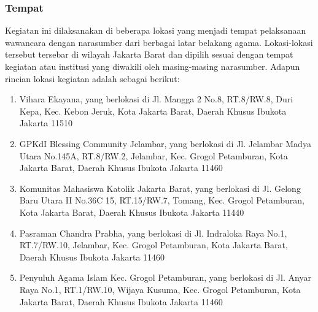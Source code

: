 \subsubsection{Tempat}
Kegiatan ini dilaksanakan di beberapa lokasi yang menjadi tempat pelaksanaan wawancara dengan narasumber dari berbagai latar belakang agama. Lokasi-lokasi tersebut tersebar di wilayah Jakarta Barat dan dipilih sesuai dengan tempat kegiatan atau institusi yang diwakili oleh masing-masing narasumber. Adapun rincian lokasi kegiatan adalah sebagai berikut:
\begin{sloppypar}
\begin{enumerate}[label = \arabic*.]
    \item Vihara Ekayana, yang berlokasi di Jl. Mangga 2 No.8, RT.8/RW.8, Duri Kepa, Kec. Kebon Jeruk, Kota Jakarta Barat, Daerah Khusus Ibukota Jakarta 11510
    
    \item GPKdI Blessing Community Jelambar, yang berlokasi di Jl. Jelambar Madya Utara No.145A, RT.8/RW.2, Jelambar, Kec. Grogol Petamburan, Kota Jakarta Barat, Daerah Khusus Ibukota Jakarta 11460
    
    \item Komunitas Mahasiswa Katolik Jakarta Barat, yang berlokasi di Jl. Gelong Baru Utara II No.36C 15, RT.15/RW.7, Tomang, Kec. Grogol Petamburan, Kota Jakarta Barat, Daerah Khusus Ibukota Jakarta 11440
    
    \item Pasraman Chandra Prabha, yang berlokasi di Jl. Indraloka Raya No.1, RT.7/RW.10, Jelambar, Kec. Grogol Petamburan, Kota Jakarta Barat, Daerah Khusus Ibukota Jakarta 11460
    
    \item Penyuluh Agama Islam Kec. Grogol Petamburan, yang berlokasi di Jl. Anyar Raya No.1, RT.1/RW.10, Wijaya Kusuma, Kec. Grogol Petamburan, Kota Jakarta Barat, Daerah Khusus Ibukota Jakarta 11460
\end{enumerate}
\end{sloppypar}



